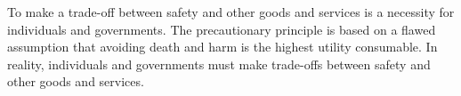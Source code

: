 \documentclass[a4paper]{article}
\begin{document}
To make a trade-off between safety and other goods and services is a necessity for individuals and governments. 
The precautionary principle is based on a flawed assumption that avoiding death and harm is the highest utility consumable.
In reality, individuals and governments must make trade-offs between safety and other goods and services.
\end{document}
